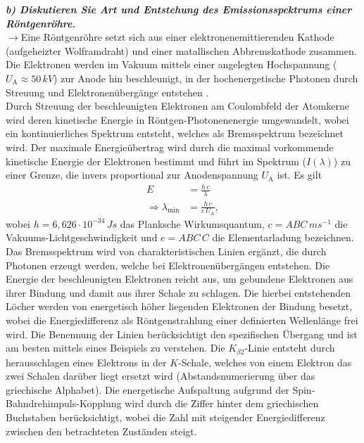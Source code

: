 \textbf{\textit{b) Diskutieren Sie Art und Entstehung des Emissionsspektrums einer 
Röntgenröhre.}}\\
$\rightarrow$Eine Röntgenröhre setzt sich aus einer elektronenemittierenden Kathode (aufgeheizter Wolframdraht) und einer 
matallischen Abbremskathode zusammen. Die Elektronen werden im Vakuum mittels einer angelegten Hochspannung 
($U_{\text{A}}\approx 50\,\si{kV}$)
zur Anode hin beschleunigt, in der hochenergetische Photonen durch Streuung und Elektronenübergänge entstehen \cite{Kristall}. \\
Durch Streuung der beschleunigten Elektronen am Coulombfeld der Atomkerne wird deren 
kinetische Energie in Röntgen-Photonenenergie umgewandelt, wobei ein kontinuierliches Spektrum entsteht, welches 
als Bremsspektrum bezeichnet wird. Der maximale Energieübertrag wird durch die maximal vorkommende kinetische 
Energie der Elektronen bestimmt und führt im Spektrum ($I(\lambda)$) zu einer Grenze, die invers proportional
zur Anodenspannung $U_{\text{A}}$ ist. Es gilt
\begin{align}
    E &= \frac{h\,c}{\lambda} \\
    \Rightarrow \lambda_{\text{min}} &= \frac{h\,c}{e\,U_{\text{A}}},
\end{align}
wobei $h = 6,626\cdot 10^{-34}\,\si{Js}$ das Planksche Wirkumsquantum, $c = ABC\,\si{ms^{-1}}$ die Vakuums-Lichtgeschwindigkeit
und $e = ABC\,\si{C}$ die Elementarladung bezeichnen. \\
Das Bremsspektrum wird von charakteristischen Linien ergänzt, die durch Photonen erzeugt werden, welche bei 
Elektronenübergängen entstehen. Die Energie der beschleunigten Elektronen reicht aus, um gebundene Elektronen 
aus ihrer Bindung und damit aus ihrer Schale zu schlagen. Die hierbei entstehenden Löcher werden von energetisch 
höher liegenden Elektronen der Bindung besetzt, wobei die Energiedifferenz als Röntgenstrahlung einer definierten 
Wellenlänge frei wird. Die Benennung der Linien berücksichtigt den spezifischen Übergang und ist 
am besten mittels eines Beispiels zu verstehen. Die $K_{\beta 2}$-Linie entsteht durch herausschlagen 
eines Elektrons in der $K$-Schale, welches von einem Elektron das zwei Schalen darüber liegt ersetzt wird  
(Abstandsnumerierung über das griechische Alphabet). Die energetische Aufspaltung aufgrund der 
Spin-Bahndrehimpuls-Kopplung wird durch die Ziffer hinter dem griechischen Buchstaben berücksichtigt,  
wobei die Zahl mit steigender Energiedifferenz zwischen den betrachteten Zuständen steigt. \\
